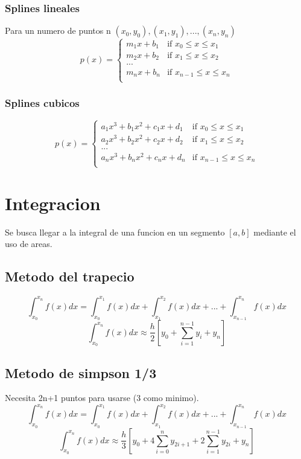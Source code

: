 \documentclass[11pt]{article}
\begin{document}
\subsubsection{Splines lineales}
Para un numero de puntos n $(x_{0},y_{0}),(x_{1},y_{1}),...,(x_{n},y_{n})$
\[p(x) =
\left\{
	\begin{array}{ll}
		m_{1}x+b_{1}  & \mbox{if } x_{0} \leq x \leq x_{1}  \\
		m_{2}x+b_{2}  & \mbox{if } x_{1} \leq x \leq x_{2}  \\
                ... \\
                m_{n}x+b_{n}  & \mbox{if } x_{n-1} \leq x \leq x_{n}  \\
	\end{array}
\right.         \]
\subsubsection{Splines cubicos}
\[p(x) =
\left\{
	\begin{array}{ll}
		a_{1}x^{3}+b_{1}x^{2}+c_{1}x+d_{1}  & \mbox{if } x_{0} \leq x \leq x_{1}  \\
		a_{2}x^{3}+b_{2}x^{2}+c_{2}x+d_{2}  & \mbox{if } x_{1} \leq x \leq x_{2}  \\
                ... \\
                a_{n}x^{3}+b_{n}x^{2}+c_{n}x+d_{n}  & \mbox{if } x_{n-1} \leq x \leq x_{n}  \\
	\end{array}
\right.         \]


\newpage
\section{Integracion}
Se busca llegar a la integral de una funcion en un segmento $[a,b]$ mediante el uso de areas.
\subsection{Metodo del trapecio}
\[ \int_{x_{0}}^{x_{n}} f(x)dx = \int_{x_{0}}^{x_{1}} f(x)dx +\int_{x_{1}}^{x_{2}} f(x)dx + ... + \int_{x_{n-1}}^{x_{n}} f(x)dx  \]
\[ \int_{x_{0}}^{x_{n}} f(x)dx \approx \dfrac{h}{2}[y_{0} + \sum_{i=1}^{n-1} y_{i} + y_{n}] \]

\subsection{Metodo de simpson 1/3}
Necesita 2n+1 puntos para usarse (3 como minimo).
\[ \int_{x_{0}}^{x_{n}} f(x)dx = \int_{x_{0}}^{x_{1}} f(x)dx +\int_{x_{1}}^{x_{2}} f(x)dx + ... + \int_{x_{n-1}}^{x_{n}} f(x)dx  \]
\[ \int_{x_{0}}^{x_{n}} f(x)dx \approx \dfrac{h}{3}[y_{0} + 4\sum_{i=0}^{n} y_{2i+1} + 2\sum_{i=1}^{n-1} y_{2i} + y_{n}] \]
\newpage
\end{document}
